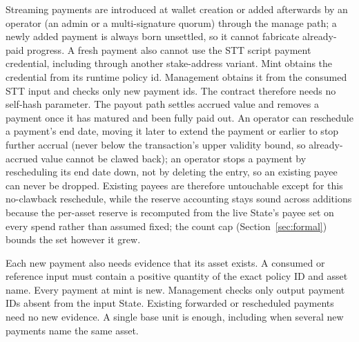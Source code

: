 \documentclass[11pt,DIV=11,parskip=half-]{scrartcl}
\begin{document}
Streaming payments are introduced at wallet creation or added afterwards by an operator (an admin or a multi-signature quorum) through the manage path; a newly added payment is always born unsettled, so it cannot fabricate already-paid progress. A fresh payment also cannot use the STT script payment credential, including through another stake-address variant. Mint obtains the credential from its runtime policy id. Management obtains it from the consumed STT input and checks only new payment ids. The contract therefore needs no self-hash parameter. The payout path settles accrued value and removes a payment once it has matured and been fully paid out. An operator can reschedule a payment's end date, moving it later to extend the payment or earlier to stop further accrual (never below the transaction's upper validity bound, so already-accrued value cannot be clawed back); an operator stops a payment by rescheduling its end date down, not by deleting the entry, so an existing payee can never be dropped. Existing payees are therefore untouchable except for this no-clawback reschedule, while the reserve accounting stays sound across additions because the per-asset reserve is recomputed from the live State's payee set on every spend rather than assumed fixed; the count cap (Section~\ref{sec:formal}) bounds the set however it grew.

Each new payment also needs evidence that its asset exists. A consumed or reference input must contain a positive quantity of the exact policy ID and asset name. Every payment at mint is new. Management checks only output payment IDs absent from the input State. Existing forwarded or rescheduled payments need no new evidence. A single base unit is enough, including when several new payments name the same asset.
\end{document}
